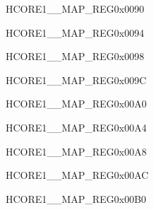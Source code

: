 \begin{register}{H}{CORE1\_\_MAP\_REG}{0x0090}\label{regdesc:CORE1LCDCAMINTMAPREG}
\end{register}\vspace{-3em}


\begin{register}{H}{CORE1\_\_MAP\_REG}{0x0094}\label{regdesc:CORE1ADCINTMAPREG}
\end{register}\vspace{-3em}


\begin{register}{H}{CORE1\_\_MAP\_REG}{0x0098}\label{regdesc:CORE1PWM0INTMAPREG}
\end{register}\vspace{-3em}


\begin{register}{H}{CORE1\_\_MAP\_REG}{0x009C}\label{regdesc:CORE1PWM1INTMAPREG}
\end{register}\vspace{-3em}


\begin{register}{H}{CORE1\_\_MAP\_REG}{0x00A0}\label{regdesc:CORE1TWAI0INTMAPREG}
\end{register}\vspace{-3em}


\begin{register}{H}{CORE1\_\_MAP\_REG}{0x00A4}\label{regdesc:CORE1TWAI1INTMAPREG}
\end{register}\vspace{-3em}


\begin{register}{H}{CORE1\_\_MAP\_REG}{0x00A8}\label{regdesc:CORE1TWAI2INTMAPREG}
\end{register}\vspace{-3em}


\begin{register}{H}{CORE1\_\_MAP\_REG}{0x00AC}\label{regdesc:CORE1RMTINTMAPREG}
\end{register}\vspace{-3em}


\begin{register}{H}{CORE1\_\_MAP\_REG}{0x00B0}\label{regdesc:CORE1I2C0INTMAPREG}
\end{register}\vspace{-3em}


